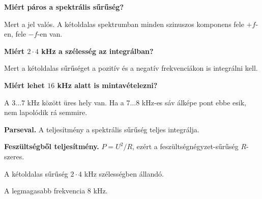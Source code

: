 \begin{elmelet}
\textbf{Miért páros a spektrális sűrűség?}\par Mert a jel valós. A kétoldalas spektrumban minden szinuszos komponens fele $+f$-en, fele $-f$-en van.

\textbf{Miért $2\cdot4$ kHz a szélesség az integrálban?}\par Mert a kétoldalas sűrűséget a pozitív és a negatív frekvenciákon is integrálni kell.

\textbf{Miért lehet $16$ kHz alatt is mintavételezni?}\par A $3\ldots7$ kHz között üres hely van. Ha a $7\ldots8$ kHz-es sáv álképe pont ebbe esik, nem lapolódik rá semmire.
\end{elmelet}
\begin{elmelet}
\textbf{Parseval.} A teljesítmény a spektrális sűrűség teljes integrálja.
\begin{center}\end{center}


\textbf{Feszültségből teljesítmény.} $P=U^2/R$, ezért a feszültségnégyzet-sűrűség $R$-szeres.
\end{elmelet}

A kétoldalas sűrűség $2\cdot4$ kHz szélességben állandó.

\begin{center}\end{center}

\begin{center}\end{center}

\begin{center}\end{center}

A legmagasabb frekvencia $8$ kHz.

